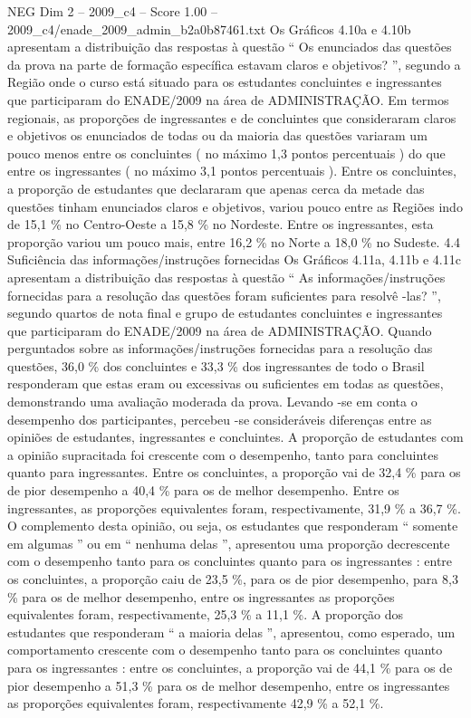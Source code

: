 \begin{textsample}{NEG Dim 2 – 2009\_c4 – Score 1.00 – 2009\_c4/enade\_2009\_admin\_b2a0b87461.txt}
Os Gráficos 4.10a e 4.10b apresentam a distribuição das respostas à questão “ Os enunciados das questões da prova na parte de formação específica estavam claros e objetivos? ”, segundo a Região onde o curso está situado para os estudantes concluintes e ingressantes que participaram do ENADE/2009 na área de ADMINISTRAÇÃO.
Em termos regionais, as proporções de ingressantes e de concluintes que consideraram claros e objetivos os enunciados de todas ou da maioria das questões variaram um pouco menos entre os concluintes ( no máximo 1,3 pontos percentuais ) do que entre os ingressantes ( no máximo 3,1 pontos percentuais ).
Entre os concluintes, a proporção de estudantes que declararam que apenas cerca da metade das questões tinham enunciados claros e objetivos, variou pouco entre as Regiões indo de 15,1 \% no Centro-Oeste a 15,8 \% no Nordeste.
Entre os ingressantes, esta proporção variou um pouco mais, entre 16,2 \% no Norte a 18,0 \% no Sudeste. 4.4 Suficiência das informações/instruções fornecidas Os Gráficos 4.11a, 4.11b e 4.11c apresentam a distribuição das respostas à questão “ As informações/instruções fornecidas para a resolução das questões foram suficientes para resolvê -las? ”, segundo quartos de nota final e grupo de estudantes concluintes e ingressantes que participaram do ENADE/2009 na área de ADMINISTRAÇÃO.
Quando perguntados sobre as informações/instruções fornecidas para a resolução das questões, 36,0 \% dos concluintes e 33,3 \% dos ingressantes de todo o Brasil responderam que estas eram ou excessivas ou suficientes em todas as questões, demonstrando uma avaliação moderada da prova.
Levando -se em conta o desempenho dos participantes, percebeu -se consideráveis diferenças entre as opiniões de estudantes, ingressantes e concluintes.
A proporção de estudantes com a opinião supracitada foi crescente com o desempenho, tanto para concluintes quanto para ingressantes.
Entre os concluintes, a proporção vai de 32,4 \% para os de pior desempenho a 40,4 \% para os de melhor desempenho.
Entre os ingressantes, as proporções equivalentes foram, respectivamente, 31,9 \% a 36,7 \%.
O complemento desta opinião, ou seja, os estudantes que responderam “ somente em algumas ” ou em “ nenhuma delas ”, apresentou uma proporção decrescente com o desempenho tanto para os concluintes quanto para os ingressantes : entre os concluintes, a proporção caiu de 23,5 \%, para os de pior desempenho, para 8,3 \% para os de melhor desempenho, entre os ingressantes as proporções equivalentes foram, respectivamente, 25,3 \% a 11,1 \%.
A proporção dos estudantes que responderam “ a maioria delas ”, apresentou, como esperado, um comportamento crescente com o desempenho tanto para os concluintes quanto para os ingressantes : entre os concluintes, a proporção vai de 44,1 \% para os de pior desempenho a 51,3 \% para os de melhor desempenho, entre os ingressantes as proporções equivalentes foram, respectivamente 42,9 \% a 52,1 \%.

\end{textsample}
